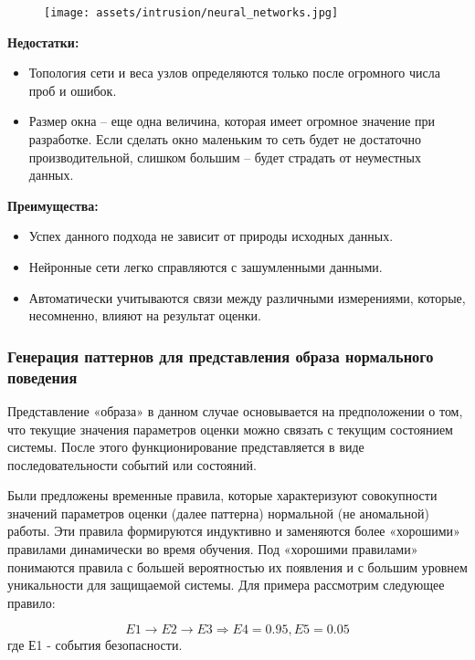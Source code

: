 \begin{figure}[h!]
    \centering
    \texttt{[image: assets/intrusion/neural\_networks.jpg]}
\end{figure}

\textbf{Недостатки:}
\begin{itemize}
    \item Топология сети и веса узлов определяются только после огромного числа проб и ошибок.
    \item Размер окна – еще одна величина, которая имеет огромное значение при разработке.
    Если сделать окно маленьким то сеть будет не достаточно производительной, слишком большим
    – будет страдать от неуместных данных.
\end{itemize}

\textbf{Преимущества:}
\begin{itemize}
    \item Успех данного подхода не зависит от природы исходных данных.
    \item Нейронные сети легко справляются с зашумленными данными.
    \item Автоматически учитываются связи между различными измерениями, которые,
    несомненно, влияют на результат оценки.
\end{itemize}
\autocite{BeynonDavies}


\subsubsection{Генерация паттернов для представления образа нормального поведения}
Представление «образа» в данном случае основывается на предположении о том, что текущие значения
параметров оценки можно связать с текущим состоянием системы. После этого функционирование
представляется в виде последовательности событий или состояний.

Были предложены временные правила, которые характеризуют совокупности значений параметров оценки
(далее паттерна) нормальной (не аномальной) работы. Эти правила формируются индуктивно и заменяются
более «хорошими» правилами динамически во время обучения. Под «хорошими правилами» понимаются правила
с большей вероятностью их появления и с большим уровнем уникальности для защищаемой системы.
Для примера рассмотрим следующее правило:

\begin{equation}
	E1 \rightarrow E2\rightarrow E3 \Rightarrow E4 = 0.95, E5 = 0.05
\end{equation}
где Е1 - события безопасности.

